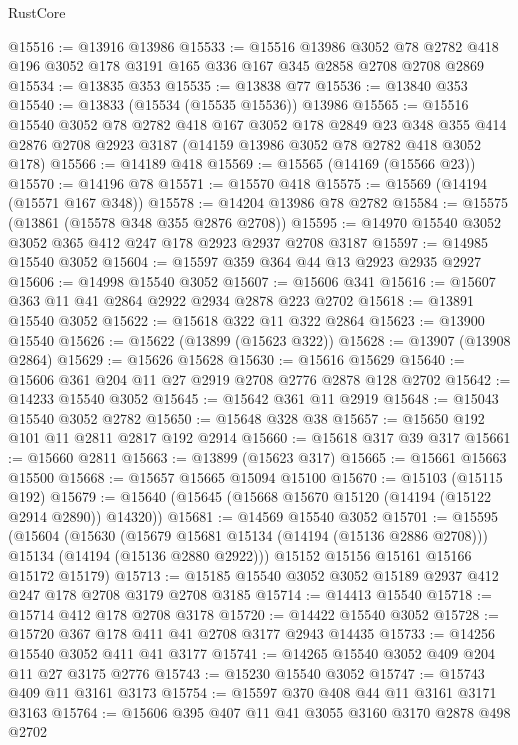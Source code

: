 \begin{lexlean}{RustCore}
\begin{coremodule}
@15516 := @13916 @13986
@15533 := @15516
    @13986
    @3052
    @78
    @2782
    @418
    @196
    @3052
    @178
    @3191
    @165
    @336
    @167
    @345
    @2858
    @2708
    @2708
    @2869
@15534 := @13835 @353
@15535 := @13838 @77
@15536 := @13840 @353
@15540 := @13833 (@15534 (@15535 @15536)) @13986
@15565 := @15516
    @15540
    @3052
    @78
    @2782
    @418
    @167
    @3052
    @178
    @2849
    @23
    @348
    @355
    @414
    @2876
    @2708
    @2923
    @3187
    (@14159 @13986 @3052 @78 @2782 @418 @3052 @178)
@15566 := @14189 @418
@15569 := @15565 (@14169 (@15566 @23))
@15570 := @14196 @78
@15571 := @15570 @418
@15575 := @15569 (@14194 (@15571 @167 @348))
@15578 := @14204 @13986 @78 @2782
@15584 := @15575 (@13861 (@15578 @348 @355 @2876 @2708))
@15595 := @14970 @15540 @3052 @3052 @365 @412 @247 @178 @2923 @2937 @2708 @3187
@15597 := @14985 @15540 @3052
@15604 := @15597 @359 @364 @44 @13 @2923 @2935 @2927
@15606 := @14998 @15540 @3052
@15607 := @15606 @341
@15616 := @15607 @363 @11 @41 @2864 @2922 @2934 @2878 @223 @2702
@15618 := @13891 @15540 @3052
@15622 := @15618 @322 @11 @322 @2864
@15623 := @13900 @15540
@15626 := @15622 (@13899 (@15623 @322))
@15628 := @13907 (@13908 @2864)
@15629 := @15626 @15628
@15630 := @15616 @15629
@15640 := @15606 @361 @204 @11 @27 @2919 @2708 @2776 @2878 @128 @2702
@15642 := @14233 @15540 @3052
@15645 := @15642 @361 @11 @2919
@15648 := @15043 @15540 @3052 @2782
@15650 := @15648 @328 @38
@15657 := @15650 @192 @101 @11 @2811 @2817 @192 @2914
@15660 := @15618 @317 @39 @317
@15661 := @15660 @2811
@15663 := @13899 (@15623 @317)
@15665 := @15661 @15663 @15500
@15668 := @15657 @15665 @15094 @15100
@15670 := @15103 (@15115 @192)
@15679 := @15640 (@15645 (@15668 @15670 @15120 (@14194 (@15122 @2914 @2890)) @14320))
@15681 := @14569 @15540 @3052
@15701 := @15595
    (@15604
      (@15630
        (@15679 @15681 @15134 (@14194 (@15136 @2886 @2708)))
        @15134
        (@14194 (@15136 @2880 @2922)))
      @15152
      @15156
      @15161
      @15166
      @15172
      @15179)
@15713 := @15185 @15540 @3052 @3052 @15189 @2937 @412 @247 @178 @2708 @3179 @2708 @3185
@15714 := @14413 @15540
@15718 := @15714 @412 @178 @2708 @3178
@15720 := @14422 @15540 @3052
@15728 := @15720 @367 @178 @411 @41 @2708 @3177 @2943 @14435
@15733 := @14256 @15540 @3052 @411 @41 @3177
@15741 := @14265 @15540 @3052 @409 @204 @11 @27 @3175 @2776
@15743 := @15230 @15540 @3052
@15747 := @15743 @409 @11 @3161 @3173
@15754 := @15597 @370 @408 @44 @11 @3161 @3171 @3163
@15764 := @15606 @395 @407 @11 @41 @3055 @3160 @3170 @2878 @498 @2702

\end{coremodule}
\end{lexlean}
